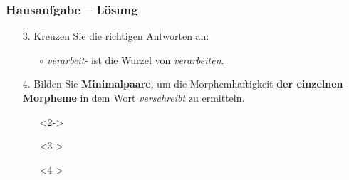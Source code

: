 \begin{frame}
\frametitle{Hausaufgabe -- Lösung}

\begin{enumerate}
	\item[3.] Kreuzen Sie die richtigen Antworten an:

	\begin{itemize}
		\item[\alertgreen{$\checkmark$}] 
		
		\item[$\circ$] \emph{verarbeit-} ist die Wurzel von \emph{verarbeiten}.
		
		\item[\alertgreen{$\checkmark$}] 
		
		\item[\alertgreen{$\checkmark$}] 
	\end{itemize}	
	

	\item[4.] Bilden Sie \textbf{Minimalpaare}, um die Morphemhaftigkeit \textbf{der einzelnen Morpheme} in dem Wort \emph{verschreibt} zu ermitteln.


\settowidth{}
	\begin{itemize}
		\item[\alertgreen{--}]<2->  
		
		\item[\alertgreen{--}]<3->  
		
		\item[\alertgreen{--}]<4->  
	\end{itemize}

\end{enumerate}

\end{frame}


